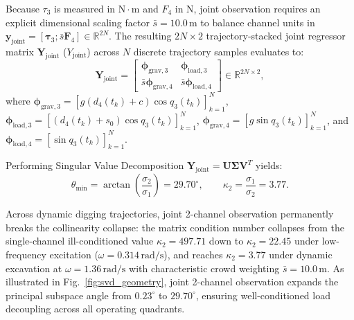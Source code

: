 \documentclass[journal]{IEEEtran}
\begin{document}
Because $\tau_3$ is measured in $\mathrm{N\cdot m}$ and $F_4$ in $\mathrm{N}$, joint observation requires an explicit dimensional scaling factor $\bar{s} = 10.0\,\mathrm{m}$ to balance channel units in $\bm{y}_{\mathrm{joint}} = [\bm{\tau}_3; \bar{s} \bm{F}_4] \in \mathbb{R}^{2N}$. The resulting $2N \times 2$ trajectory-stacked joint regressor matrix $\bm{Y}_{\mathrm{joint}}$ ($Y_{\mathrm{joint}}$) across $N$ discrete trajectory samples evaluates to:
\begin{equation}
\bm{Y}_{\mathrm{joint}} = \begin{bmatrix} \bm{\phi}_{\mathrm{grav},3} & \bm{\phi}_{\mathrm{load},3} \\ \bar{s}\bm{\phi}_{\mathrm{grav},4} & \bar{s}\bm{\phi}_{\mathrm{load},4} \end{bmatrix} \in \mathbb{R}^{2N \times 2},
\label{eq:joint_regressor}
\end{equation}
where $\bm{\phi}_{\mathrm{grav},3} = [g(d_4(t_k)+c)\cos q_3(t_k)]_{k=1}^N$, $\bm{\phi}_{\mathrm{load},3} = [(d_4(t_k)+s_0)\cos q_3(t_k)]_{k=1}^N$, $\bm{\phi}_{\mathrm{grav},4} = [g\sin q_3(t_k)]_{k=1}^N$, and $\bm{\phi}_{\mathrm{load},4} = [\sin q_3(t_k)]_{k=1}^N$.

Performing Singular Value Decomposition $\bm{Y}_{\mathrm{joint}} = \bm{U} \bm{\Sigma} \bm{V}^T$ yields:
\begin{equation}
\theta_{\min} = \arctan\left(\frac{\sigma_2}{\sigma_1}\right) = 29.70^\circ, \qquad \kappa_2 = \frac{\sigma_1}{\sigma_2} = 3.77.
\end{equation}

Across dynamic digging trajectories, joint 2-channel observation permanently breaks the collinearity collapse: the matrix condition number collapses from the single-channel ill-conditioned value $\kappa_2 = 497.71$ down to $\kappa_2 = 22.45$ under low-frequency excitation ($\omega = 0.314\,\mathrm{rad/s}$), and reaches $\kappa_2 = 3.77$ under dynamic excavation at $\omega = 1.36\,\mathrm{rad/s}$ with characteristic crowd weighting $\bar{s} = 10.0\,\mathrm{m}$. As illustrated in Fig.~\ref{fig:svd_geometry}, joint 2-channel observation expands the principal subspace angle from $0.23^\circ$ to $29.70^\circ$, ensuring well-conditioned load decoupling across all operating quadrants.
\end{document}
